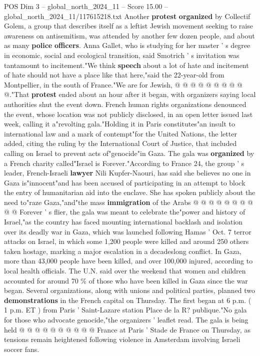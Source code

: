 \begin{textsample}{POS Dim 3 – global\_north\_2024\_11 – Score 15.00 – global\_north\_2024\_11/117615218.txt}
Another \textbf{protest} \textbf{organized} by Collectif Golem, a group that describes itself as a leftist Jewish movement seeking to raise awareness on antisemitism, was attended by another few dozen people, and about as many \textbf{police} \textbf{officers}.
Anna Gallet, who is studying for her master ' s degree in economic, social and ecological transition, said Smotrich ' s invitation was tantamount to incitement."We think \textbf{speech} about a lot of hate and incitement of hate should not have a place like that here,"said the 22-year-old from Montpellier, in the south of France."We are for Jewish, @ @ @ @ @ @ @ @ @ @."That \textbf{protest} ended about an hour after it began, with organizers saying local authorities shut the event down.
French human rights organizations denounced the event, whose location was not publicly disclosed, in an open letter issued last week, calling it a"revolting gala."Holding it in Paris constitutes"an insult to international law and a mark of contempt"for the United Nations, the letter added, citing the ruling by the International Court of Justice, that included calling on Israel to prevent acts of"genocide"in Gaza.
The gala was \textbf{organized} by a French charity called"Israel is Forever."According to France 24, the group ' s leader, French-Israeli \textbf{lawyer} Nili Kupfer-Naouri, has said she believes no one in Gaza is"innocent"and has been accused of participating in an attempt to block the entry of humanitarian aid into the enclave.
She has spoken publicly about the need to"raze Gaza,"and"the mass \textbf{immigration} of the Arabs @ @ @ @ @ @ @ @ @ @ Forever ' s flier, the gala was meant to celebrate the"power and history of Israel,"as the country has faced mounting international backlash and isolation over its deadly war in Gaza, which was launched following Hamas ' Oct. 7 terror attacks on Israel, in which some 1,200 people were killed and around 250 others taken hostage, marking a major escalation in a decadeslong conflict.
In Gaza, more than 43,000 people have been killed, and over 100,000 injured, according to local health officials.
The U.N. said over the weekend that women and children accounted for around 70 \% of those who have been killed in Gaza since the war began.
Several organizations, along with unions and political parties, planned two \textbf{demonstrations} in the French capital on Thursday.
The first began at 6 p.m. ( 1 p.m.
ET ) from Paris ' Saint-Lazare station Place de la R? publique."No gala for those who advocate genocide,"the organizers ' leaflet read.
The gala is being held @ @ @ @ @ @ @ @ @ @ France at Paris ' Stade de France on Thursday, as tensions remain heightened following violence in Amsterdam involving Israeli soccer fans.

\end{textsample}
